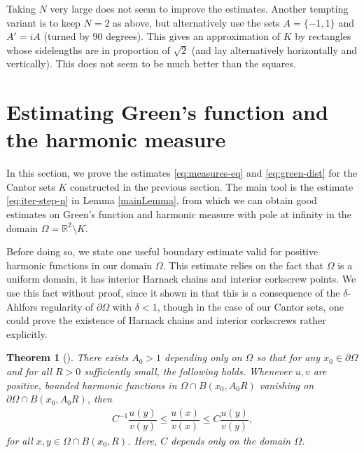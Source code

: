 \documentclass[JEP,XML,SOM,Unicode,published]{cedram}
\let\sm\setminus
\numberwithin{equation}{section}
\theoremstyle{plain}
\newtheorem{thm}[lem]{Theorem}
\theoremstyle{definition}
\newcommand{\R}{\mathbb{R}}
\let\sm\setminus
\newcommand{\R}{\mathbb{R}}
\begin{document}
Taking $N$ very large does not seem to improve the estimates.
Another tempting variant is to keep $N=2$ as above, but alternatively use the sets $A = \{ -1, 1 \}$
and $A' = i A$ (turned by $90$ degrees). This gives an approximation of $K$ by rectangles whose
sidelengths are in proportion of $\sqrt 2$ (and lay alternatively horizontally and vertically).
This does not seem to be much better than the squares.

\section[Green's function and the harmonic measure]{Estimating Green's function and the harmonic measure}
\label{sec:Green}

In this section, we prove the estimates \eqref{eq:measures-eq} and \eqref{eq:green-dist} for the Cantor sets $K$
constructed in the previous section. The main tool is the estimate \eqref{eq:iter-step-n} in Lemma \ref{mainLemma},
from which we can obtain good estimates on Green's function and harmonic measure with pole at infinity
in the domain $\Omega=\R^2\sm K$.

Before doing so, we state one useful boundary estimate valid for positive harmonic functions in our domain $\Omega$. This estimate relies on the fact that $\Omega$ is a uniform domain, \ie it has interior Harnack chains and interior corkscrew points. We use this fact without proof, since it shown in \cite[Lem.\,2.2]{DFM-Memoirs} that this is a consequence of the $\delta$-Ahlfors regularity of $\partial \Omega$ with $\delta < 1$, though in the case of our Cantor sets, one could prove the existence of Harnack chains and interior corkscrews rather explicitly.

\begin{thm}[{\cite[Th.\,1]{Aikawa01}}] \label{thm:bdry_harnack}
There exists $A_0 >1$ depending only on $\Omega$ so that for any $x_0 \in \partial \Omega$ and for all $R >0$ sufficiently small, the following holds. Whenever $u, v$ are positive, bounded harmonic functions in $\Omega \cap B(x_0, A_0 R)$ vanishing on $\partial \Omega \cap B(x_0, A_0R)$, then
\begin{align*}
C^{-1} \dfrac{u(y)}{v(y) } \le \dfrac{u(x)}{v(x)} \le C \dfrac{u(y)}{v(y)},
\end{align*}
for all $x,y \in \Omega \cap B(x_0, R)$. Here, $C$ depends only on the domain $\Omega$.
\end{thm}
\end{document}
